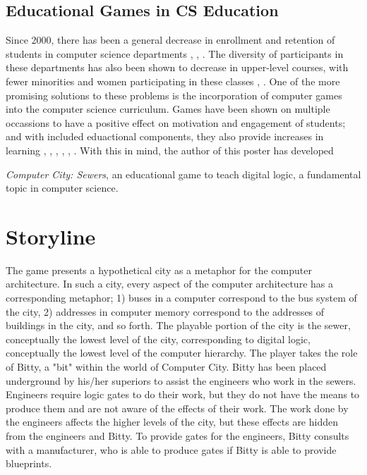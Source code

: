 \documentclass[12pt]{article}	%
\begin{document}
\subsection*{Educational Games in CS Education}
Since 2000, there has been a general decrease in enrollment and retention of students in computer science departments \citep{Sung}, \citep{Wu}, \citep{Leutenegger}.  The diversity of participants in these departments has also been shown to decrease in upper-level courses, with fewer minorities and women participating in these classes \citep{Sung}, \citep{Wu}.  One of the more promising solutions to these problems is the incorporation of computer games into the computer science curriculum.  Games have been shown on multiple occassions to have a positive effect on motivation and engagement of students; and with included eduactional components, they also provide increases in learning \citep{Wu}, \citep{deLaet}, \citep{Bayliss}, \citep{Wolz}, \citep{Flavor}, \citep{Belfore}.  With this in mind, the author of this poster has developed {\textit{Computer City:  Sewers}, an educational game to teach digital logic, a fundamental topic in computer science.

\section*{Storyline}

The game presents a hypothetical city as a metaphor for the computer architecture.  In such a city, every aspect of the computer architecture has a corresponding metaphor; 1) buses in a computer correspond to the bus system of the city, 2) addresses in computer memory correspond to the addresses of buildings in the city, and so forth.  The playable portion of the city is the sewer, conceptually the lowest level of the city, corresponding to digital logic, conceptually the lowest level of the computer hierarchy.  The player takes the role of Bitty, a "bit" within the world of Computer City.  Bitty has been placed underground by his/her superiors to assist the engineers who work in the sewers.  Engineers require logic gates to do their work, but they do not have the means to produce them and are not aware of the effects of their work.  The work done by the engineers affects the higher levels of the city, but these effects are hidden from the engineers and Bitty.  To provide gates for the engineers, Bitty consults with a manufacturer, who is able to produce gates if Bitty is able to provide blueprints.

}
\end{document}
